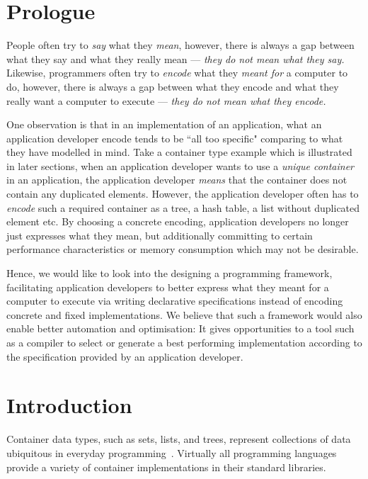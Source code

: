 \section{Prologue}
\label{chap2:prologue}
People often try to \emph{say} what they \emph{mean}, however, there is always a gap between what they say and what they really mean --- \emph{they do not mean what they say.} Likewise, programmers often try to \emph{encode} what they \emph{meant for} a computer to do, however, there is always a gap between what they encode and what they really want a computer to execute --- \emph{they do not mean what they encode.}

One observation is that in an implementation of an application, what an application developer encode tends to be ``all too specific" comparing to what they have modelled in mind.
Take a container type example which is illustrated in later sections, when an application developer wants to use a \emph{unique container} in an application, the application developer \emph{means} that the container does not contain any duplicated elements. However, the application developer often has to \emph{encode} such a required container as a tree, a hash table, a list without duplicated element etc. By choosing a concrete encoding, application developers no longer just expresses what they mean, but additionally committing to certain performance characteristics or memory consumption which may not be desirable.

Hence, we would like to look into the designing a programming framework, facilitating application developers to better express what they meant for a computer to execute via writing declarative specifications instead of encoding concrete and fixed implementations. 
We believe that such a framework would also enable better automation and optimisation: It gives opportunities to a tool such as a compiler to select or generate a best performing implementation according to the specification provided by an application developer.


\section{Introduction}
\label{chap2:introduction}
Container data types, such as sets, lists, and trees, represent collections of data ubiquitous in everyday programming~\citep{DBLP:books/daglib/0023376}. Virtually all programming languages provide a variety of container implementations in their standard libraries.

